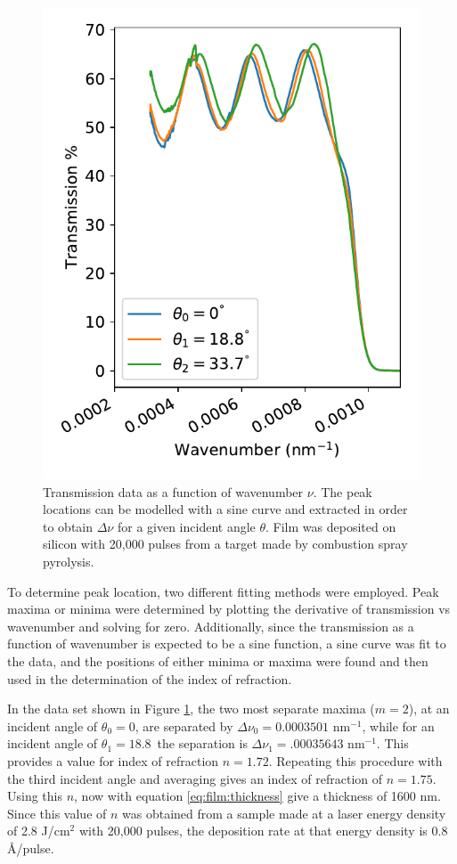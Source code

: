 \begin{figure}
    \centering
    \includegraphics{Figures/190515-spectrophotometry.pdf}
    \caption{Transmission data as a function of wavenumber $\nu$. The peak locations can be modelled with a sine curve and extracted in order to obtain $\Delta \nu$ for a given incident angle $\theta$. Film was deposited on silicon with 20,000 pulses from a target made by combustion spray pyrolysis.}
    \label{fig:film:sp:transmVsAngle}
\end{figure}

To determine peak location, two different fitting methods were employed. Peak maxima or minima were determined by plotting the derivative of transmission vs wavenumber and solving for zero. Additionally, since the transmission as a function of wavenumber is expected to be a sine function, a sine curve was fit to the data, and the positions of either minima or maxima were found and then used in the determination of the index of refraction. 

In the data set shown in Figure \ref{fig:film:sp:transmVsAngle}, the two most separate maxima ($m=2$), at an incident angle of $\theta_0 = 0$\textdegree, are separated by $\Delta \nu_0 = 0.0003501 $ nm$^{-1}$, while for an incident angle of $\theta_1 = 18.8$\textdegree\ the separation is $\Delta \nu_1 = .00035643$ nm$^{-1}$. This provides a value for index of refraction $n = 1.72$. Repeating this procedure with the third incident angle and averaging gives an index of refraction of $n=1.75$. Using this $n$, now with equation \ref{eq:film:thickness} give a thickness of 1600 nm. Since this value of $n$ was obtained from a sample made at a laser energy density of 2.8 J/cm$^2$ with 20,000 pulses, the deposition rate at that energy density is 0.8 \AA/pulse. 

